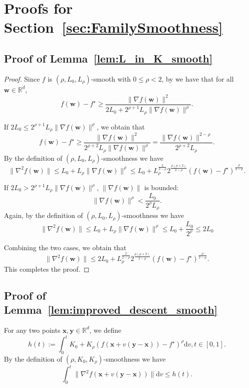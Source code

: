 \documentclass{article}
\newcommand{\bw}{\mathbf{w}}
\newcommand{\bx}{\mathbf{x}}
\newcommand{\by}{\mathbf{y}}
\newcommand{\RR}{\mathbb{R}}
\begin{document}
\section{Proofs for Section~\ref{sec:FamilySmoothness}}

\subsection{Proof of Lemma~\ref{lem:L_in_K_smooth}}
\begin{proof}
        Since $f$ is $(\rho, L_0, L_\rho)$-smooth with $0\leq\rho <2$, by \cite[Lemma 3.5]{li2023convex} we have that for all $\bw\in\RR^{d}$, 
    $$
f(\bw)-f^\star\geq \frac{\|\nabla f(\bw)\|^2}{2L_0+2^{\rho+1}L_\rho\|\nabla f(\bw)\|^\rho}.$$

    If $2L_0 \leq 2^{\rho+1}L_\rho\|\nabla f(\bw)\|^\rho$, we obtain that 
    $$f(\bw)-f^\star\geq \frac{\|\nabla f(\bw)\|^2}{2^{\rho+2}L_\rho\|\nabla f(\bw)\|^\rho}=\frac{\|\nabla f(\bw)\|^{2-\rho}}{2^{\rho+2}L_\rho}.$$
    By the definition of $(\rho,L_0,L_\rho)$-smoothness we have 
    $$\|\nabla^2 f(\bw)\|\leq L_0+L_\rho\|\nabla f(\bw)\|^\rho\leq L_0+L_\rho^{\frac{2}{2-\rho}}2^{\frac{\rho(\rho+2)}{2-\rho}}\left(f(\bw)-f^\star\right)^{\frac{\rho}{2-\rho}}.$$

    If $2L_0 > 2^{\rho+1}L_\rho\|\nabla f(\bw)\|^\rho$, $\|\nabla f(\bw)\|$ is bounded:
    $$\|\nabla f(\bw)\|^\rho < \frac{L_0}{2^\rho L_\rho}.$$
    Again, by the definition of $(\rho,L_0,L_\rho)$-smoothness we have
    $$\|\nabla^2 f(\bw)\|\leq L_0+L_\rho\|\nabla f(\bw)\|^\rho\leq L_0+\frac{L_0}{2^\rho}\leq 2L_0$$

    Combining the two cases, we obtain that
    $$\|\nabla^2 f(\bw)\|\leq 2L_0+L_\rho^{\frac{2}{2-\rho}}2^{\frac{\rho(\rho+2)}{2-\rho}}\left(f(\bw)-f^\star\right)^{\frac{\rho}{2-\rho}}.$$
    This completes the proof.
\end{proof}


\subsection{Proof of Lemma~\ref{lem:improved_descent_smooth}}

For any two points $\bx,\by\in\mathbb{R}^d$, we 
define 
\begin{equation}\label{eq:defi_ht}
    h(t):=\int_0^t K_0+K_\rho\left(f\left(\bx+v(\by-\bx)\right)-f^\star\right)^\rho \mathrm{d}v,t\in[0,1].
\end{equation}
By the definition of $(\rho,K_0,K_\rho)$-smoothness we have 
\begin{equation}\label{eq:ht_integral}
    \int_0^t \|\nabla^2 f(\bx+v(\by-\bx))\|\mathrm{d}v\leq h(t).
\end{equation}
\end{document}
